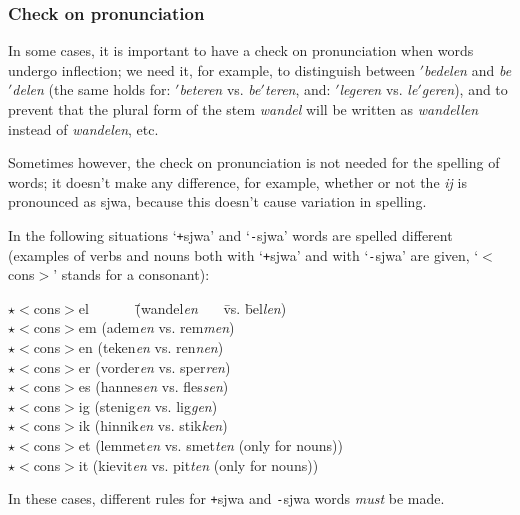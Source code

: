 \subsubsection{Check on pronunciation}

In some cases, it is important to have a check on pronunciation when words
undergo inflection; we need it, for example, to distinguish between 
$'${\em bedelen} and {\em be}$'${\em delen}
(the same holds for: $'${\em beteren} vs. {\em be}$'${\em teren}, 
and: $'${\em legeren} vs. {\em le}$'${\em geren}), and
to prevent that the plural form of the stem {\em wandel} will be written as
{\em wandellen} instead of {\em wandelen}, etc.

Sometimes however, the check on pronunciation is not needed for the spelling
of words; it doesn't make any difference, for example, whether or not the
{\em ij} is pronounced as sjwa, because this doesn't cause variation in 
spelling.

In the following situations `{\tt +}sjwa'
and `{\tt -}sjwa' words are spelled different 
(examples of verbs and nouns both with `{\tt +}sjwa' and with `{\tt -}sjwa' 
are given, `$<$cons$>$' stands for a consonant):

\begin{tabbing}
  $\star$$<$cons$>$el \ \ \ \ \ \ \= \= (wandel{\em en} \ \ \  \= vs. 
                       \= bel{\em len}) \= \\
  $\star$$<$cons$>$em \> \> (adem{\em en}    \> vs. \> rem{\em men}) \> \\
  $\star$$<$cons$>$en \> \> (teken{\em en}   \> vs. \> ren{\em nen}) \> \\
  $\star$$<$cons$>$er \> \> (vorder{\em en}  \> vs. \> sper{\em ren}) \> \\
  $\star$$<$cons$>$es \> \> (hannes{\em en}  \> vs. \> fles{\em sen}) \> \\
  $\star$$<$cons$>$ig \> \> (stenig{\em en}  \> vs. \> lig{\em gen}) \> \\
  $\star$$<$cons$>$ik \> \> (hinnik{\em en}  \> vs. \> stik{\em ken}) \> \\
  $\star$$<$cons$>$et \> \> (lemmet{\em en}  \> vs. \> smet{\em ten}  \> 
                       (only for nouns)) \\
  $\star$$<$cons$>$it \> \> (kievit{\em en}  \> vs. \> pit{\em ten}   \> 
                       (only for nouns)) \\
\end{tabbing}

In these cases, different rules for {\tt +}sjwa and {\tt -}sjwa words 
{\em must} be made.

